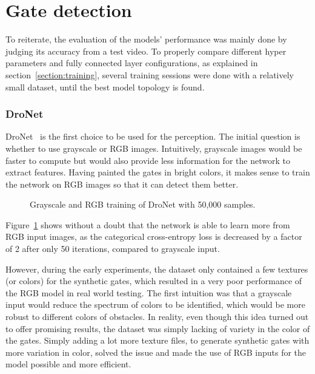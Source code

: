 \section{Gate detection}

To reiterate, the evaluation of the models' performance was mainly done by
judging its accuracy from a test video. To properly compare different
hyper parameters and fully connected layer configurations, as explained in
section~\ref{section:training}, several training sessions were done with a
relatively small dataset, until the best model topology is found.

\subsubsection{DroNet}

DroNet~\cite{dronet} is the first choice to be used for the perception. The
initial question is whether to use grayscale or RGB images. Intuitively,
grayscale images would be faster to compute but would also provide less
information for the network to extract features. Having painted the gates in
bright colors, it makes sense to train the network on RGB images so that it can
detect them better.

\begin{figure}[h]
	\centering
	
	\caption{Grayscale and RGB training of DroNet with 50,000 samples.}
	\label{plot:grayscale-vs-rgb-dronet}
\end{figure}

Figure~\ref{plot:grayscale-vs-rgb-dronet} shows without a doubt that the
network is able to learn more from RGB input images, as the categorical
cross-entropy loss is decreased by a factor of 2 after only 50 iterations,
compared to grayscale input.

However, during the early experiments, the dataset only contained a few
textures (or colors) for the synthetic gates, which resulted in a very poor
performance of the RGB model in real world testing. The first intuition was
that a grayscale input would reduce the spectrum of colors to be identified,
which would be more robust to different colors of obstacles. In reality, even
though this idea turned out to offer promising results, the dataset was simply
lacking of variety in the color of the gates. Simply adding a lot more texture
files, to generate synthetic gates with more variation in color, solved the
issue and made the use of RGB inputs for the model possible and more
efficient.\\

